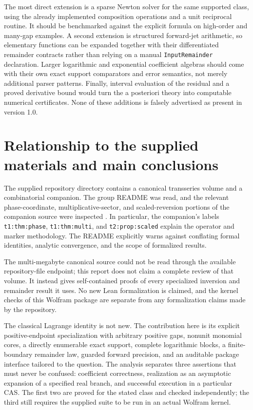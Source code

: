 \documentclass[11pt,a4paper]{article}
\numberwithin{equation}{section}
\theoremstyle{definition}
\theoremstyle{remark}
\begin{document}
The most direct extension is a sparse Newton solver for the same supported
class, using the already implemented composition operations and a unit
reciprocal routine. It should be benchmarked against the explicit formula
on high-order and many-gap examples. A second extension is structured
forward-jet arithmetic, so elementary functions can be expanded together
with their differentiated remainder contracts rather than relying on a
manual \texttt{InputRemainder} declaration. Larger logarithmic and
exponential coefficient algebras should come with their own exact support
comparators and error semantics, not merely additional parser patterns.
Finally, interval evaluation of the residual and a proved derivative bound
would turn the a posteriori theory into computable numerical certificates.
None of these additions is falsely advertised as present in version 1.0.

\section{Relationship to the supplied materials and main conclusions}
\label{sec:relation}

The supplied repository directory contains a canonical transseries volume
and a combinatorial companion. The group README was read, and the relevant
phase-coordinate, multiplicative-sector, and scaled-reversion portions of
the companion source were inspected \cite{reporeadme,repocompanion}.
In particular, the companion's labels
\texttt{t1:thm:phase}, \texttt{t1:thm:multi}, and
\texttt{t2:prop:scaled} explain the operator and marker methodology.
The README explicitly warns against conflating formal identities, analytic
convergence, and the scope of formalized results.

The multi-megabyte canonical source could not be read through the available
repository-file endpoint; this report does not claim a complete review of
that volume. It instead gives self-contained proofs of every specialized
inversion and remainder result it uses. No new Lean formalization is
claimed, and the kernel checks of this Wolfram package are separate from
any formalization claims made by the repository.

The classical Lagrange identity is not new. The contribution here is its
explicit positive-endpoint specialization with arbitrary positive gaps,
nonunit monomial cores, a directly enumerable exact support, complete
logarithmic blocks, a finite-boundary remainder law, guarded forward
precision, and an auditable package interface tailored to the question.
The analysis separates three assertions that must never be confused:
coefficient correctness, realization as an asymptotic expansion of a
specified real branch, and successful execution in a particular CAS.
The first two are proved for the stated class and checked independently;
the third still requires the supplied suite to be run in an actual Wolfram
kernel.
\end{document}
